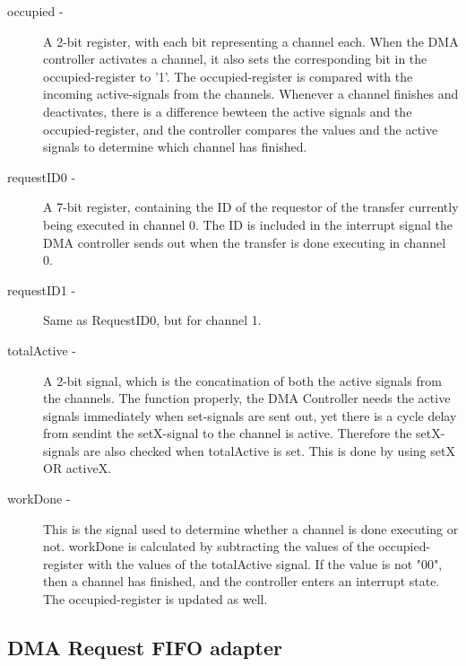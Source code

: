 \begin{appendix}
\begin{description}
    \item[occupied -]
    A 2-bit register, with each bit representing a channel each.
    When the DMA controller activates a channel, it also sets the corresponding bit in the occupied-register to '1'.
    The occupied-register is compared with the incoming active-signals from the channels.
    Whenever a channel finishes and deactivates, there is a difference bewteen the active signals and the occupied-register, and the controller compares the values and the active signals to determine which channel has finished.
    \item[requestID0 -]
    A 7-bit register, containing the ID of the requestor of the transfer currently being executed in channel 0.
    The ID is included in the interrupt signal the DMA controller sends out when the transfer is done executing in channel 0.
    \item[requestID1 -]
    Same as RequestID0, but for channel 1.
    \item[totalActive -]
    A 2-bit signal, which is the concatination of both the active signals from the channels.
    The function properly, the DMA Controller needs the active signals immediately when set-signals are sent out, yet there is a cycle delay from sendint the setX-signal to the channel is active.
    Therefore the setX-signals are also checked when totalActive is set.
    This is done by using setX OR activeX.
    \item[workDone - ]
    This is the signal used to determine whether a channel is done executing or not.
    workDone is calculated by subtracting the values of the occupied-register with the values of the totalActive signal.
    If the value is not "00", then a channel has finished, and the controller enters an interrupt state.
    The occupied-register is updated as well.
\end{description}

\subsection{DMA Request FIFO adapter}


\end{appendix}
